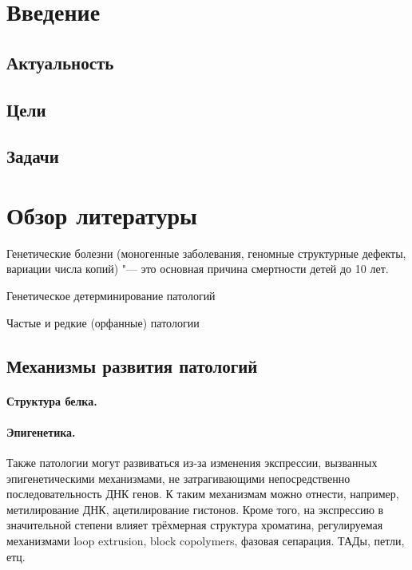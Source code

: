 \documentclass[a4paper,12pt]{article}
\begin{document}
\tableofcontents

\section{Введение}

\subsection{Актуальность}

\subsection{Цели}

\subsection{Задачи}

\section{Обзор литературы}

Генетические болезни (моногенные заболевания, геномные структурные дефекты, вариации числа копий) "--- это основная причина смертности детей до 10 лет.

Генетическое детерминирование патологий

Частые и редкие (орфанные) патологии

\subsection{Механизмы развития патологий}

\paragraph{Структура белка.}

\paragraph{Эпигенетика.}
Также патологии могут развиваться из-за изменения экспрессии, вызванных эпигенетическими механизмами, не затрагивающими непосредственно последовательность ДНК генов.
К таким механизмам можно отнести, например, метилирование ДНК, ацетилирование гистонов.
Кроме того, на экспрессию в значительной степени влияет трёхмерная структура хроматина, регулируемая механизмами loop extrusion, block copolymers, фазовая сепарация.
ТАДы, петли, етц.
\end{document}
